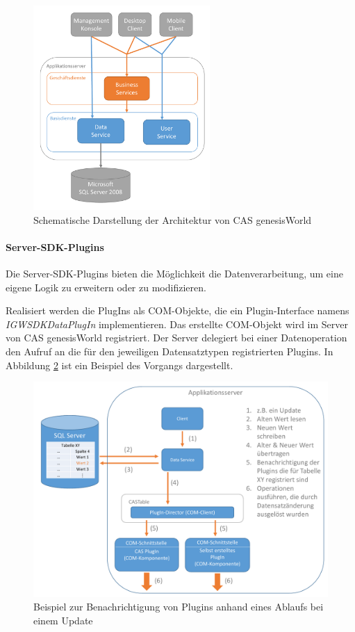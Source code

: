 \begin{figure}[H]
	\centering
  \includegraphics[width=0.6\textwidth, width=0.6\textwidth]{pics/GenesisWorld_Architektur.pdf}
	\caption{Schematische Darstellung der Architektur von CAS genesisWorld}
	\label{gw_Architektur}
\end{figure}

\paragraph{Server-SDK-Plugins}

Die Server-SDK-Plugins bieten die Möglichkeit die Datenverarbeitung, um eine eigene Logik zu erweitern oder zu modifizieren. 

Realisiert werden die PlugIns als COM-Objekte, die ein Plugin-Interface namens \textit{IGWSDKDataPlugIn} implementieren. Das erstellte COM-Objekt wird im Server von CAS genesisWorld registriert. Der Server delegiert bei einer Datenoperation den Aufruf an die für den jeweiligen Datensatztypen registrierten Plugins. In Abbildung \ref{gw_plugin} ist ein Beispiel des Vorgangs dargestellt.

\begin{figure}[H]
	\centering
  \includegraphics[width=1.0\textwidth, width=1.0\textwidth]{pics/analyse_plugins.pdf}
	\caption{Beispiel zur Benachrichtigung von Plugins anhand eines Ablaufs bei einem Update}
	\label{gw_plugin}
\end{figure}

